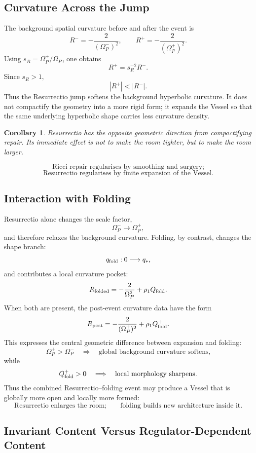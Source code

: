 \documentclass[11pt,a4paper,oneside]{book}
\theoremstyle{plain}
\newtheorem{corollary}{Corollary}[chapter]
\theoremstyle{definition}
\theoremstyle{remark}
\begin{document}
\subsection{Curvature Across the Jump}

The background spatial curvature before and after the event is
\[
R^-=-\frac{2}{(\Omega_P^-)^2},
\qquad
R^+=-\frac{2}{(\Omega_P^+)^2}.
\]
Using \(s_R=\Omega_P^+/\Omega_P^-\), one obtains
\[
R^+=s_R^{-2}R^-.
\]
Since \(s_R>1\),
\[
|R^+|<|R^-|.
\]
Thus the Resurrectio jump softens the background hyperbolic curvature. It
does not compactify the geometry into a more rigid form; it expands the Vessel
so that the same underlying hyperbolic shape carries less curvature density.

\begin{corollary}
Resurrectio has the opposite geometric direction from compactifying repair.
Its immediate effect is not to make the room tighter, but to make the room
larger.
\end{corollary}

\[
\boxed{
\text{Ricci repair regularises by smoothing and surgery;}
}
\]
\[
\boxed{
\text{Resurrectio regularises by finite expansion of the Vessel.}
}
\]

\subsection{Interaction with Folding}

Resurrectio alone changes the scale factor,
\[
\Omega_P^-\longrightarrow \Omega_P^+,
\]
and therefore relaxes the background curvature. Folding, by contrast, changes
the shape branch:
\[
q_{\rm fold}:0\longrightarrow q_\ast,
\]
and contributes a local curvature pocket:
\[
R_{\rm folded}
=
-\frac{2}{\Omega_P^2}
+
\rho_1Q_{\rm fold}.
\]
When both are present, the post-event curvature data have the form
\[
R_{\rm post}
=
-\frac{2}{(\Omega_P^+)^2}
+
\rho_1Q_{\rm fold}^+.
\]
This expresses the central geometric difference between expansion and
folding:
\[
\Omega_P^+>\Omega_P^-
\quad
\Longrightarrow
\quad
\text{global background curvature softens,}
\]
while
\[
Q_{\rm fold}^+>0
\quad
\Longrightarrow
\quad
\text{local morphology sharpens.}
\]
Thus the combined Resurrectio--folding event may produce a Vessel that is
globally more open and locally more formed:
\[
\boxed{
\text{Resurrectio enlarges the room;}
\qquad
\text{folding builds new architecture inside it.}
}
\]

\subsection{Invariant Content Versus Regulator-Dependent Content}
\end{document}
